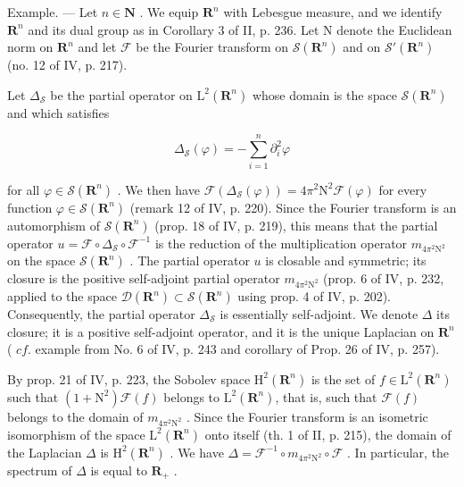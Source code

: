 Example. --- Let \(n \in \mathbf{N}\) . We equip \(\mathbf{R}^{n}\) with Lebesgue measure, and we identify \(\mathbf{R}^{n}\) and its dual group as in Corollary 3 of II, p. 236. Let N denote the Euclidean norm on \(\mathbf{R}^{n}\) and let \(\mathcal{F}\) be the Fourier transform on \(\mathcal{S}(\mathbf{R}^{n})\) and on \(\mathcal{S}'(\mathbf{R}^{n})\) (no. 12 of IV, p. 217).

Let \(\Delta_{\mathcal{S}}\) be the partial operator on \(\mathrm{L}^2 (\mathbf{R}^n)\) whose domain is the space \(\mathcal{S}(\mathbf{R}^n)\) and which satisfies

\[
\Delta_ {\mathcal {S}} (\varphi) = - \sum_ {i = 1} ^ {n} \partial_ {i} ^ {2} \varphi
\]

for all \(\varphi\in\mathcal{S}(\mathbf{R}^{n})\) . We then have \(\mathcal{F}(\Delta_{\mathcal{S}}(\varphi))=4\pi^{2}\mathrm{N}^{2}\mathcal{F}(\varphi)\) for every function \(\varphi\in\mathcal{S}(\mathbf{R}^{n})\) (remark 12 of IV, p. 220). Since the Fourier transform is an automorphism of \(\mathcal{S}(\mathbf{R}^{n})\) (prop. 18 of IV, p. 219), this means that the partial operator \(u=\mathcal{F}\circ\Delta_{\mathcal{S}}\circ\mathcal{F}^{-1}\) is the reduction of the multiplication operator \(m_{4\pi^{2}\mathrm{N}^{2}}\) on the space \(\mathcal{S}(\mathbf{R}^{n})\) . The partial operator \(u\) is closable and symmetric; its closure is the positive self-adjoint partial operator \(m_{4\pi^{2}\mathrm{N}^{2}}\) (prop. 6 of IV, p. 232, applied to the space \(\mathcal{D}(\mathbf{R}^{n})\subset\mathcal{S}(\mathbf{R}^{n})\) using prop. 4 of IV, p. 202). Consequently, the partial operator \(\Delta_{\mathcal{S}}\) is essentially self-adjoint. We denote \(\Delta\) its closure; it is a positive self-adjoint operator, and it is the unique Laplacian on \(\mathbf{R}^{n}\) ( \(cf.\) example from No. 6 of IV, p. 243 and corollary of Prop. 26 of IV, p. 257).

By prop. 21 of IV, p. 223, the Sobolev space \(\mathrm{H}^2 (\mathbf{R}^n)\) is the set of \(f\in \mathrm{L}^2 (\mathbf{R}^n)\) such that \((1 + \mathrm{N}^2)\mathcal{F}(f)\) belongs to \(\mathrm{L}^2 (\mathbf{R}^n)\), that is, such that \(\mathcal{F}(f)\) belongs to the domain of \(m_{4\pi^2\mathrm{N}^2}\) . Since the Fourier transform is an isometric isomorphism of the space \(\mathrm{L}^2 (\mathbf{R}^n)\) onto itself (th. 1 of II, p. 215), the domain of the Laplacian \(\Delta\) is \(\mathrm{H}^2 (\mathbf{R}^n)\) . We have \(\Delta = \mathcal{F}^{-1}\circ m_{4\pi^2\mathrm{N}^2}\circ \mathcal{F}\) . In particular, the spectrum of \(\Delta\) is equal to \(\mathbf{R}_{+}\) .
\relax{}
